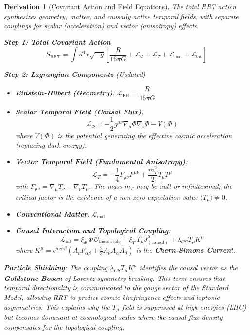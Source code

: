 \documentclass[10pt, a4paper]{article}
\newcommand{\Lagrange}{\mathscr{L}}
\newcommand{\xiphi}{\xi_\Phi}  %
\newcommand{\xiT}{\xi_T}       %
\newtheorem{derivation}{Derivation}
\begin{document}
\begin{derivation}[Covariant Action and Field Equations]
The total RRT action synthesizes geometry, matter, and causally active temporal fields, with separate couplings for scalar (acceleration) and vector (anisotropy) effects.

\textbf{Step 1: Total Covariant Action}
\begin{equation}
S_{\text{RRT}} = \int d^4x \sqrt{-g} \left[ \frac{R}{16\pi G} + \Lagrange_\Phi + \Lagrange_T + \Lagrange_{\text{mat}} + \Lagrange_{\text{int}} \right]
\tag{1.1}
\end{equation}

\textbf{Step 2: Lagrangian Components} (Updated)
\begin{itemize}
\item \textbf{Einstein-Hilbert (Geometry)}: $\Lagrange_{\text{EH}} = \dfrac{R}{16\pi G}$
\item \textbf{Scalar Temporal Field (Causal Flux)}:
\begin{equation}
\Lagrange_\Phi = -\frac{1}{2} g^{\mu\nu} \nabla_\mu \Phi \nabla_\nu \Phi - V(\Phi)
\tag{1.2}
\end{equation}
where $V(\Phi)$ is the potential generating the effective cosmic acceleration (replacing dark energy).
\item \textbf{Vector Temporal Field (Fundamental Anisotropy)}:
\begin{equation}
\Lagrange_T = -\frac{1}{4} F_{\mu\nu} F^{\mu\nu} + \frac{m_T^2}{2} T_\mu T^\mu
\tag{1.3}
\end{equation}
with $F_{\mu\nu} = \nabla_\mu T_\nu - \nabla_\nu T_\mu$. The mass $m_T$ may be null or infinitesimal; the critical factor is the existence of a non-zero expectation value $\langle T_\mu \rangle \neq 0$.
\item \textbf{Conventional Matter}: $\Lagrange_{\text{mat}}$
\item \textbf{Causal Interaction and Topological Coupling}:
\begin{equation}
\Lagrange_{\text{int}} = \xiphi \, \Phi \, \mathscr{O}_{\text{mass scale}} + \xiT \, T_\mu J^\mu_{(\text{causal})} + \lambda_{CS} T_\mu K^\mu
\tag{1.4}
\end{equation}
where $K^\mu = \epsilon^{\mu\nu\alpha\beta} (A_\nu F_{\alpha\beta} + \frac{2}{3} A_\nu A_\alpha A_\beta)$ is the \textbf{Chern-Simons Current}. 
\end{itemize}

\textbf{Particle Shielding}: The coupling $\lambda_{CS} T_\mu K^\mu$ identifies the causal vector as the \textbf{Goldstone Boson} of Lorentz symmetry breaking. This term ensures that temporal directionality is communicated to the gauge sector of the Standard Model, allowing RRT to predict cosmic birefringence effects and leptonic asymmetries. This explains why the $T_\mu$ field is suppressed at high energies (LHC) but becomes dominant at cosmological scales where the causal flux density compensates for the topological coupling.


\end{derivation}
\end{document}
